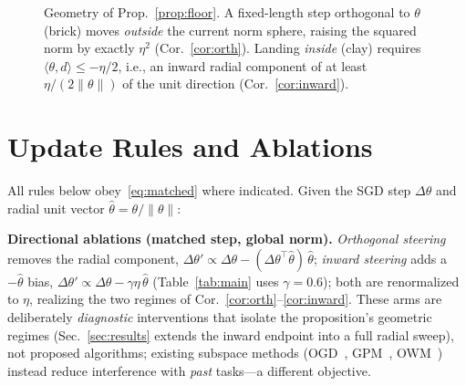 \documentclass[conference]{IEEEtran}
\begin{document}
\begin{figure}[tb]
\centering
{}
\caption{{Geometry of Prop.~\ref{prop:floor}. A fixed-length step orthogonal to
$\theta$ (brick) moves \emph{outside} the current norm sphere, raising the squared
norm by exactly $\eta^{2}$ (Cor.~\ref{cor:orth}). Landing \emph{inside} (clay)
requires $\langle\theta,d\rangle\le-\eta/2$, i.e., an inward radial component of at
least $\eta/(2\lVert\theta\rVert)$ of the unit direction (Cor.~\ref{cor:inward}).}}
\label{fig:geom}
\end{figure}

\section{Update Rules and Ablations}\label{sec:method}
All rules below obey~\eqref{eq:matched} where indicated. Given the SGD step
$\Delta\theta$ and radial unit vector $\hat\theta=\theta/\lVert\theta\rVert$:

\textbf{Directional ablations (matched step, global norm).} \emph{Orthogonal
steering} removes the radial component,
$\Delta\theta'\propto\Delta\theta-(\Delta\theta^{\top}\hat\theta)\,\hat\theta$;
\emph{inward steering} adds a $-\hat\theta$ bias,
$\Delta\theta'\propto\Delta\theta-\gamma\eta\,\hat\theta$ {(Table~\ref{tab:main}
uses $\gamma{=}0.6$)}; both are renormalized
to $\eta$, realizing the two regimes of Cor.~\ref{cor:orth}--\ref{cor:inward}.
These arms are deliberately \emph{diagnostic} interventions that isolate the
proposition's geometric regimes (Sec.~\ref{sec:results} extends the inward endpoint
into a full radial sweep), not proposed algorithms; existing subspace methods
(OGD~\cite{farajtabar2020}, GPM~\cite{saha2021gpm}, OWM~\cite{zeng2019owm}) instead
reduce interference with \emph{past} tasks---a different objective.
\end{document}
